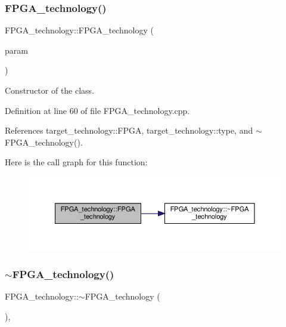 \subsubsection{\texorpdfstring{F\+P\+G\+A\+\_\+technology()}{FPGA\_technology()}}
{\footnotesize\ttfamily F\+P\+G\+A\+\_\+technology\+::\+F\+P\+G\+A\+\_\+technology (\begin{DoxyParamCaption}\item[{const \hyperlink{Parameter_8hpp_a37841774a6fcb479b597fdf8955eb4ea}{Parameter\+Const\+Ref} \&}]{param }\end{DoxyParamCaption})\hspace{0.3cm}{\ttfamily [explicit]}}



Constructor of the class. 



Definition at line 60 of file F\+P\+G\+A\+\_\+technology.\+cpp.



References target\+\_\+technology\+::\+F\+P\+GA, target\+\_\+technology\+::type, and $\sim$\+F\+P\+G\+A\+\_\+technology().

Here is the call graph for this function\+:
\nopagebreak
\begin{figure}[H]
\begin{center}
\leavevmode
\includegraphics[width=350pt]{dd/ded/classFPGA__technology_a1fecc7f78e4a1257cc091b07f134bddc_cgraph}
\end{center}
\end{figure}
\mbox{\label{classFPGA__technology_a3d1ce24723204df9418d88cdb145f7bf}} 
\subsubsection{\texorpdfstring{$\sim$\+F\+P\+G\+A\+\_\+technology()}{~FPGA\_technology()}}
{\footnotesize\ttfamily F\+P\+G\+A\+\_\+technology\+::$\sim$\+F\+P\+G\+A\+\_\+technology (\begin{DoxyParamCaption}{ }\end{DoxyParamCaption})\hspace{0.3cm}{\ttfamily [override]}, {\ttfamily [default]}}



